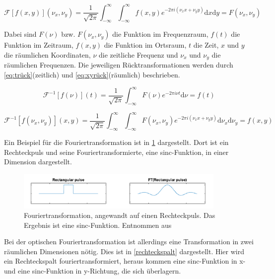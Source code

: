\begin{equation}
	\mathcal{F}\left[ f\left( x,y\right) \right] \left( \nu_x, \nu_y\right) = \frac{1}{\sqrt{2\pi}} \int_{-\infty}^{\infty} \int_{-\infty}^{\infty} f\left( x, y\right) e^{-2\pi i (\nu_x x + \nu_y y)} \text{d}x \text{d}y = F\left( \nu_x, \nu_y\right) 
	\label{eq:xyfourier}
\end{equation}

Dabei sind $F\left( \nu\right)$ bzw. $F\left( \nu_x, \nu_y\right)$ die Funktion im Frequenzraum, $f\left( t\right)$ die Funktion im Zeitraum, $f\left( x,y\right)$ die Funktion im Ortsraum, $t$ die Zeit, $x$ und $y$ die räumlichen Koordinaten, $\nu$ die zeitliche Frequenz und $\nu_x$ und $\nu_y$ die räumlichen Frequenzen. Die jeweiligen Rücktransformationen werden durch \cref{eq:trück}(zeitlich) und \cref{eq:xyrück}(räumlich) beschrieben.

\begin{equation}
	\mathcal{F}^{-1}\left[ f\left( \nu\right) \right] \left( t\right) = \frac{1}{\sqrt{2\pi}} \int_{-\infty}^{\infty} F\left( \nu\right) e^{-2\pi i \nu t} \text{d}\nu = f\left( t\right) 
	\label{eq:trück}
\end{equation}

\begin{equation}
	\mathcal{F}^{-1}\left[ f\left( \nu_x,\nu_y\right) \right] \left( x, y\right) = \frac{1}{\sqrt{2\pi}} \int_{-\infty}^{\infty} \int_{-\infty}^{\infty} F\left( \nu_x,\nu_y\right) e^{-2\pi i (\nu_x x + \nu_y y)} \text{d}\nu_x \text{d}\nu_y = f\left( x, y\right) 
	\label{eq:xyrück}
\end{equation}

Ein Beispiel für die Fouriertransformation ist in \cref{rechteckpuls} dargestellt. Dort ist ein Rechteckpuls und seine Fouriertransformierte, eine sinc-Funktion, in einer Dimension dargestellt. 

\begin{figure}[h!]
	\centering
	\includegraphics[width=0.9\textwidth]{rechteckpuls.PNG}
	\caption{Fouriertransformation, angewandt auf einen Rechteckpuls. Das Ergebnis ist eine sinc-Funktion. Entnommen aus \autocite{anleitung-ws2014}}
	\label{rechteckpuls}
\end{figure}

Bei der optischen Fouriertransformation ist allerdings eine Transformation in zwei räumlichen Dimensionen nötig. Dies ist in \cref{rechteckspalt} dargestellt. Hier wird ein Rechteckspalt fouriertransformiert, heraus kommen eine sinc-Funktion in x- und eine sinc-Funktion in y-Richtung, die sich überlagern.

